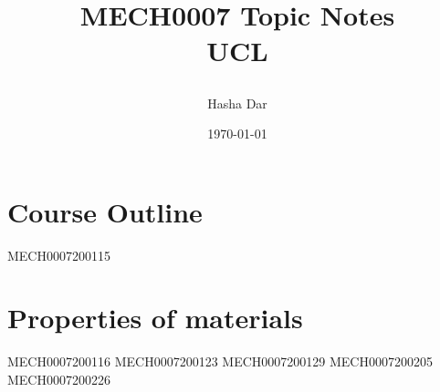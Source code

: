 \documentclass[12pt,a4paper, twoside]{report}
\begin{document}
\title{
  {MECH0007 Topic Notes}\\
  {\large UCL}
  \author{Hasha Dar}
  \date{\today}
}
\maketitle
\tableofcontents
\chapter{Course Outline}
{MECH0007200115}
\chapter{Properties of materials}
{MECH0007200116}
{MECH0007200123}
{MECH0007200129}
{MECH0007200205}
{MECH0007200226}
\end{document}
